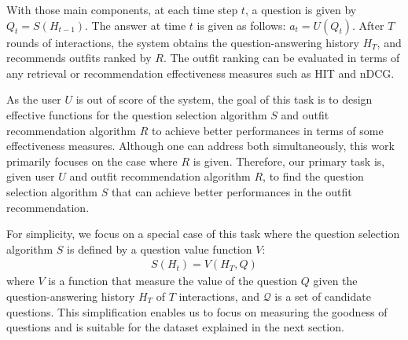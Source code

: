 With those main components, at each time step $t$, a question is given by $Q_t = S(H_{t-1})$.
The answer at time $t$ is given as follows: $a_t = U(Q_t)$.
After $T$ rounds of interactions, the system obtains the question-answering history $H_T$,
and recommends outfits ranked by $R$.
The outfit ranking can be evaluated in terms of any retrieval or recommendation effectiveness measures
such as HIT and nDCG.

As the user $U$ is out of score of the system, the goal of this task is to design effective functions for 
the question selection algorithm $S$ and outfit recommendation algorithm $R$
to achieve better performances in terms of some effectiveness measures.
Although one can address both simultaneously,
this work primarily focuses on the case where $R$ is given.
Therefore, our primary task is,
given user $U$ and outfit recommendation algorithm $R$,
to find the question selection algorithm $S$ that can achieve better performances
in the outfit recommendation.

For simplicity, we focus on a special case of this task
where the question selection algorithm $S$ is defined by a question value function $V$:
\begin{eqnarray}
S(H_t) = V(H_T, Q)
\label{eq:question_value}
\end{eqnarray}
where $V$ is a function that measure the value of the question $Q$ given the question-answering history $H_T$ of $T$ interactions,
and $\mathcal{Q}$ is a set of candidate questions. 
This simplification enables us to focus on measuring the goodness of questions and is suitable for the dataset explained in the next section.